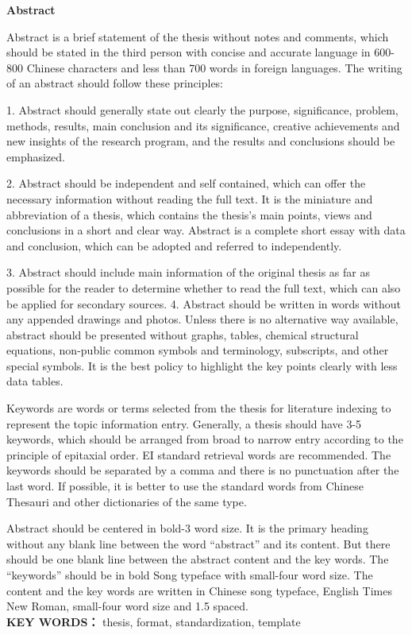 


\begin{center}\heiti\sanhao\textbf{
        Abstract
    }
\end{center}

Abstract is a brief statement of the thesis without notes and comments, which should be stated in the third person with concise and accurate language in 600-800 Chinese characters and less than 700 words in foreign languages. The writing of an abstract should follow these principles:

1. Abstract should generally state out clearly the purpose, significance, problem, methods, results, main conclusion and its significance, creative achievements and new insights of the research program, and the results and conclusions should be emphasized. 

2. Abstract should be independent and self contained, which can offer the necessary information without reading the full text. It is the miniature and abbreviation of a thesis, which contains the thesis’s main points, views and conclusions in a short and clear way. Abstract is a complete short essay with data and conclusion, which can be adopted and referred to independently. 

3. Abstract should include main information of the original thesis as far as possible for the reader to determine whether to read the full text, which can also be applied for secondary sources. 
4. Abstract should be written in words without any appended drawings and photos. Unless there is no alternative way available, abstract should be presented without graphs, tables, chemical structural equations, non-public common symbols and terminology, subscripts, and other special symbols. It is the best policy to highlight the key points clearly with less data tables.

Keywords are words or terms selected from the thesis for literature indexing to represent the topic information entry. Generally, a thesis should have 3-5 keywords, which should be arranged from broad to narrow entry according to the principle of epitaxial order. EI standard retrieval words are recommended. The keywords should be separated by a comma and there is no punctuation after the last word. If possible, it is better to use the standard words from Chinese Thesauri and other dictionaries of the same type. 

Abstract should be centered in bold-3 word size. It is the primary heading without any blank line between the word “abstract” and its content. But there should be one blank line between the abstract content and the key words. The “keywords” should be in bold Song typeface with small-four word size. The content and the key words are written in Chinese song typeface, English Times New Roman, small-four word size and 1.5 spaced.\\

\quad \noindent \textbf{KEY WORDS：} thesis, format, standardization, template

\clearpage